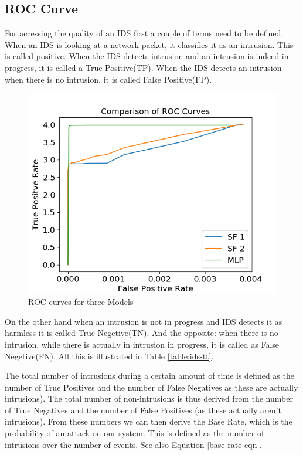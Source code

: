 \documentclass[12pt]{article}
\theoremstyle{definition}
\begin{document}
		\subsection{ROC Curve}
		For accessing the quality of an IDS first a couple of terms need to be defined. When an IDS is looking at a network packet, it classifies it as an intrusion. This is called positive. When the IDS detects intrusion and an intrusion is indeed in progress, it is called a True Positive(TP). When the IDS detects an intrusion when there is no intrusion, it is called False Positive(FP).
		\begin{figure}[!h]
			\centering
			\includegraphics[width=400pt]{pictures/allroc.png}
			\caption{ROC curves for three Models}
			\label{fig:sf12-accu}
		\end{figure}
		On the other hand when an intrusion is not in progress and IDS detects it as harmless it is called True Negetive(TN). And the opposite: when there is no intrusion, while there is actually in intrusion in progress, it is called as False Negetive(FN). All this is illustrated in Table \ref{table:ids-tt}.
		
		The total number of intrusions during a certain amount of time is defined as the number of True Positives and the number of False Negatives as these are actually intrusions). The total number of non-intrusions is thus derived from the number of True Negatives and the number of False Positives (as these actually aren’t intrusions). From these numbers we can then derive the Base Rate, which is the probability of an attack on our
		system. This is defined as the number of intrusions over the number of events. See also Equation \ref{base-rate-eqn}.
		
\end{document}
